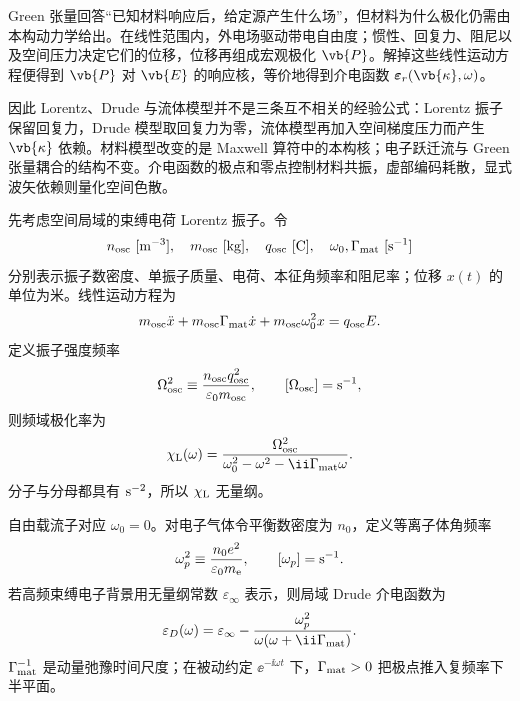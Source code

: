 Green 张量回答“已知材料响应后，给定源产生什么场”，但材料为什么极化仍需由本构动力学给出。在线性范围内，外电场驱动带电自由度；惯性、回复力、阻尼以及空间压力决定它们的位移，位移再组成宏观极化 $\vb{P}$。解掉这些线性运动方程便得到 $\vb{P}$ 对 $\vb{E}$ 的响应核，等价地得到介电函数 $\boldsymbol\varepsilon_r(\vb{\kappa},\omega)$。

因此 Lorentz、Drude 与流体模型并不是三条互不相关的经验公式：Lorentz 振子保留回复力，Drude 模型取回复力为零，流体模型再加入空间梯度压力而产生 $\vb{\kappa}$ 依赖。材料模型改变的是 Maxwell 算符中的本构核；电子跃迁流与 Green 张量耦合的结构不变。介电函数的极点和零点控制材料共振，虚部编码耗散，显式波矢依赖则量化空间色散。


先考虑空间局域的束缚电荷 Lorentz 振子。令
\begin{equation*}
n_{\rm osc}\ [{\rm m^{-3}}],
\quad
m_{\rm osc}\ [{\rm kg}],
\quad
q_{\rm osc}\ [{\rm C}],
\quad
\omega_0,\Gamma_{\rm mat}\ [{\rm s^{-1}}]
\end{equation*}
分别表示振子数密度、单振子质量、电荷、本征角频率和阻尼率；位移 $x(t)$ 的单位为米。线性运动方程为
\begin{equation*}
m_{\rm osc}\ddot x
+m_{\rm osc}\Gamma_{\rm mat}\dot x
+m_{\rm osc}\omega_0^2x
=q_{\rm osc}E.
\end{equation*}
定义振子强度频率
\begin{equation*}
\Omega_{\rm osc}^2
\equiv
\frac{n_{\rm osc}q_{\rm osc}^2}
{\varepsilon_0m_{\rm osc}},
\qquad
[\Omega_{\rm osc}]={\rm s^{-1}},
\end{equation*}
则频域极化率为
\begin{equation*}
\chi_{\rm L}(\omega)
=\frac{\Omega_{\rm osc}^2}
{\omega_0^2-\omega^2-\ii\Gamma_{\rm mat}\omega}.
\end{equation*}
分子与分母都具有 ${\rm s^{-2}}$，所以 $\chi_{\rm L}$ 无量纲。

自由载流子对应 $\omega_0=0$。对电子气体令平衡数密度为 $n_0$，定义等离子体角频率
\begin{equation*}
\omega_p^2
\equiv\frac{n_0e^2}{\varepsilon_0m_{\mathrm e}},
\qquad
[\omega_p]={\rm s^{-1}}.
\end{equation*}
若高频束缚电子背景用无量纲常数 $\varepsilon_\infty$ 表示，则局域 Drude 介电函数为
\begin{equation*}
\varepsilon_D(\omega)
=\varepsilon_\infty
-\frac{\omega_p^2}
{\omega(\omega+\ii\Gamma_{\rm mat})}.
\end{equation*}
$\Gamma_{\rm mat}^{-1}$ 是动量弛豫时间尺度；在被动约定 $\ee^{-\ii\omega t}$ 下，$\Gamma_{\rm mat}>0$ 把极点推入复频率下半平面。

